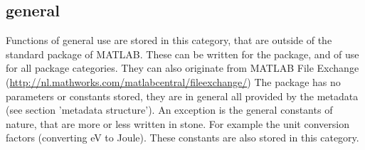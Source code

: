 \newpage
\subsection{general}
Functions of general use are stored in this category, that are outside of the standard package of MATLAB. These can be written for the package, and of use for all package categories. They can also originate from MATLAB File Exchange (\url{http://nl.mathworks.com/matlabcentral/fileexchange/}) 
The package has no parameters or constants stored, they are in general all provided by the metadata (see section 'metadata structure'). An exception is the general constants of nature, that are more or less written in stone. For example the unit conversion factors (converting eV to Joule). These constants are also stored in this category.

